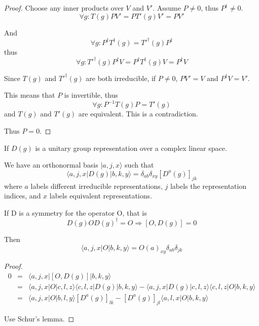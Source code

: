 \documentclass[12pt]{book}
\begin{document}
	\begin{proof}
		Choose any inner products over $V$ and $V'$. Assume $P\neq0$, thus $P^\dagger\neq0$.
		\begin{equation}
		\forall g:T(g)P V'=P T'(g)V'=PV'
		\end{equation}
		
		And
		\begin{equation}
		\forall g:P^\dagger T^\dagger(g)=T'^\dagger(g)P^\dagger
		\end{equation}
		thus
		\begin{equation}
		\forall g:T'^\dagger(g)P^\dagger V=P^\dagger T^\dagger(g) V=P^\dagger V
		\end{equation}
		
		Since $T(g)$ and $T'^\dagger(g)$ are both irreducible, if $P\neq 0$, $P V'=V$ and $P^\dagger V=V'$.
		
		This means that $P$ is invertible, thus
		\begin{equation}
			\forall g:P^{-1}T(g)P=T'(g)
		\end{equation}
		and $T(g)$ and $T'(g)$ are equivalent. This is a contradiction.
		
		Thus $P=0$.
	\end{proof}
	\begin{theorem}
	If $D(g)$ is a unitary group representation over a complex linear space.
	
	We have an orthonormal basis $|a,j,x\rangle$ such that
	\begin{equation}
		\langle a,j,x|D(g)|b,k,y\rangle=\delta_{ab}\delta_{xy}[D^a(g)]_{jk}
	\end{equation}
	where $a$ labels different irreducible representations, $j$ labels the representation indices, and $x$ labels equivalent representations. 
	
	If D is a symmetry for the operator O, that is 
	\begin{equation}
		D(g)OD(g)^\dagger=O\Rightarrow[O,D(g)]=0
	\end{equation}
	
	Then
	\begin{equation}
		\langle a,j,x|O|b,k,y\rangle=O(a)_{xy}\delta_{ab}\delta_{jk}
	\end{equation}
	\end{theorem}	
	
	\begin{proof}
		
	\begin{eqnarray}
		0&=&\langle a,j,x|[O,D(g)]|b,k,y\rangle\\
		&=&\langle a,j,x|O|c,l,z\rangle\langle c,l,z|D(g)|b,k,y\rangle-\langle a,j,x|D(g)|c,l,z\rangle\langle c,l,z|O|b,k,y\rangle\\
		&=&\langle a,j,x|O|b,l,y\rangle[D^a(g)]_{lk}-[D^a(g)]_{jl}\langle a,l,x|O|b,k,y\rangle
	\end{eqnarray}
	
	Use Schur's lemma.
	\end{proof}
	
\end{document}
